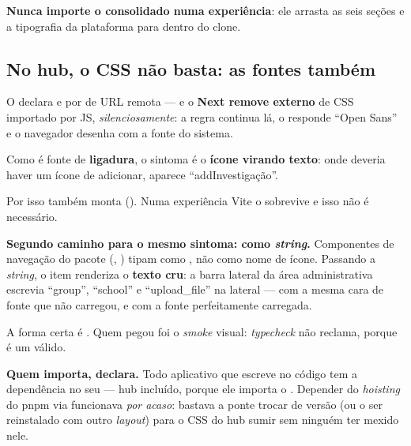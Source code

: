 \begin{regra}
\textbf{Nunca importe o consolidado  numa experiência}: ele
arrasta as seis seções e a tipografia da plataforma para dentro do clone.
\end{regra}

\subsection{No hub, o CSS não basta: as fontes também}

\begin{atencao}
O  declara  e  por
 de URL remota --- e o \textbf{Next remove  externo} de
CSS importado por JS, \emph{silenciosamente}: a regra continua lá, o
 responde \enquote{Open Sans} e o navegador desenha com a
fonte do sistema.

Como  é fonte de \textbf{ligadura}, o sintoma é o
\textbf{ícone virando texto}: onde deveria haver um ícone de adicionar, aparece
\enquote{addInvestigação}.

Por isso  também monta
 (). Numa experiência Vite o
 sobrevive e isso não é necessário.
\end{atencao}

\begin{atencao}
\textbf{Segundo caminho para o mesmo sintoma:  como \emph{string}.}
Componentes de navegação do pacote (, ) tipam  como
, não como nome de ícone. Passando a \emph{string}, o item
renderiza o \textbf{texto cru}: a barra lateral da área administrativa escrevia
\enquote{group}, \enquote{school} e \enquote{upload\_file} na lateral --- com a
mesma cara de fonte que não carregou, e com a fonte perfeitamente carregada.

A forma certa é . Quem pegou foi o
\emph{smoke} visual: \emph{typecheck} não reclama, porque  é um
 válido.
\end{atencao}

\begin{regra}
\textbf{Quem importa, declara.} Todo aplicativo que escreve
 no código tem a dependência no seu
 --- hub incluído, porque ele importa o .
Depender do \emph{hoisting} do pnpm via  funcionava
\emph{por acaso}: bastava a ponte trocar de versão (ou o  ser
reinstalado com outro \emph{layout}) para o CSS do hub sumir sem ninguém ter
mexido nele.
\end{regra}


